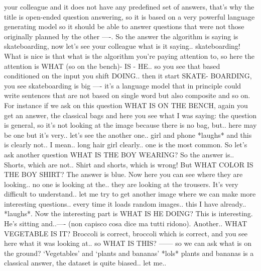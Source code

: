 your colleague and it does not have any predefined set of answers, that’s why the title is open-ended question answering, so it is based on a very powerful language generating model so it should be able to answer questions that were not those originally planned by the other —-. So the answer the algorithm is saying is skateboarding, now let’s see your colleague what is it saying.. skateboarding! What is nice is that what is the algorithm you’re paying attention to, so here the attention is WHAT (so on the bench)- IS - HE.. so you see that based conditioned on the input you shift DOING.. then it start SKATE- BOARDING, you see skateboarding is big —- it’s a language model that in principle could write sentences that are not based on single word but also composite and so on. For instance if we ask on this question WHAT IS ON THE BENCH, again you get an answer, the classical bags and here you see what I was saying: the question is general, so it’s not looking at the image because there is no bag, but.. here may be one but it’s very.. let’s see the another one.. girl and phone *laughs* and this is clearly not.. I mean.. long hair girl clearly.. one is the most common. So let’s ask another question WHAT IS THE BOY WEARING? So the answer is.. Shorts, which are not.. Shirt and shorts, which is wrong! But WHAT COLOR IS THE BOY SHIRT? The answer is blue. Now here you can see where they are looking.. no one is looking at the.. they are looking at the trousers. It’s very difficult to understand.. let me try to get another image where we can make more interesting questions.. every time it loads random images.. this I have already.. *laughs*. Now the interesting part is WHAT IS HE DOING? This is interesting. He’s sitting and..—- (non capisco cosa dice ma tutti ridono). Another.. WHAT VEGETABLE IS IT? Broccoli is correct, broccoli which is correct, and you see here what it was looking at.. so WHAT IS THIS? —— so we can ask what is on the ground? ‘Vegetables’ and ‘plants and bananas’ *lols* plants and bananas is a classical answer, the dataset is quite biased.. let me..